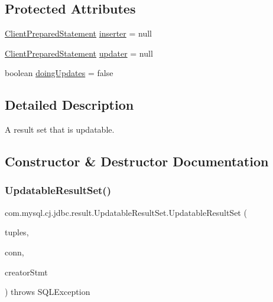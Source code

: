 \subsection*{Protected Attributes}
\begin{DoxyCompactItemize}
\item 
\mbox{\hyperlink{classcom_1_1mysql_1_1cj_1_1jdbc_1_1_client_prepared_statement}{Client\+Prepared\+Statement}} \mbox{\hyperlink{classcom_1_1mysql_1_1cj_1_1jdbc_1_1result_1_1_updatable_result_set_a0296181dd8c57b0ac49ca09e01cfd033}{inserter}} = null
\item 
\mbox{\hyperlink{classcom_1_1mysql_1_1cj_1_1jdbc_1_1_client_prepared_statement}{Client\+Prepared\+Statement}} \mbox{\hyperlink{classcom_1_1mysql_1_1cj_1_1jdbc_1_1result_1_1_updatable_result_set_a9102f47e2a47b392b64e246fdf8a0640}{updater}} = null
\item 
boolean \mbox{\hyperlink{classcom_1_1mysql_1_1cj_1_1jdbc_1_1result_1_1_updatable_result_set_a6ebd846a7eac89f8ba9aec9523889003}{doing\+Updates}} = false
\end{DoxyCompactItemize}


\subsection{Detailed Description}
A result set that is updatable. 

\subsection{Constructor \& Destructor Documentation}
\mbox{\label{classcom_1_1mysql_1_1cj_1_1jdbc_1_1result_1_1_updatable_result_set_a1518489c8c8ca80e7c0759ce169e9477}} 
\subsubsection{\texorpdfstring{Updatable\+Result\+Set()}{UpdatableResultSet()}}
{\footnotesize\ttfamily com.\+mysql.\+cj.\+jdbc.\+result.\+Updatable\+Result\+Set.\+Updatable\+Result\+Set (\begin{DoxyParamCaption}\item[{\mbox{\hyperlink{interfacecom_1_1mysql_1_1cj_1_1protocol_1_1_resultset_rows}{Resultset\+Rows}}}]{tuples,  }\item[{\mbox{\hyperlink{interfacecom_1_1mysql_1_1cj_1_1jdbc_1_1_jdbc_connection}{Jdbc\+Connection}}}]{conn,  }\item[{\mbox{\hyperlink{classcom_1_1mysql_1_1cj_1_1jdbc_1_1_statement_impl}{Statement\+Impl}}}]{creator\+Stmt }\end{DoxyParamCaption}) throws S\+Q\+L\+Exception}

